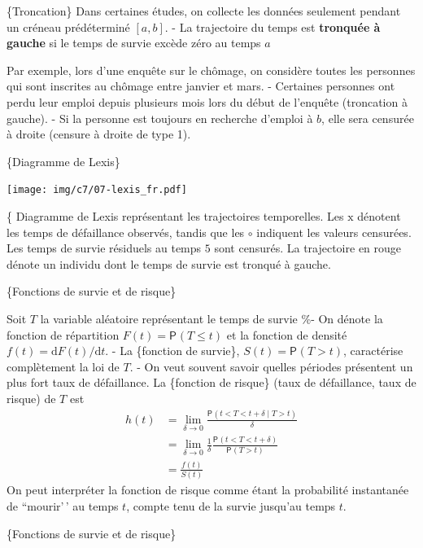 \documentclass[
  11pt,
  letterpaper,
]{article}
\theoremstyle{definition}
\theoremstyle{definition}
\theoremstyle{definition}
\theoremstyle{definition}
\theoremstyle{remark}
\begin{document}
\{Troncation\}
Dans certaines études, on collecte les données seulement pendant un créneau prédéterminé \([a, b]\).
- La trajectoire du temps est \textbf{tronquée à gauche} si le temps de survie excède zéro au temps \(a\)

Par exemple, lors d'une enquête sur le chômage, on considère toutes les personnes qui sont inscrites au chômage entre janvier et mars.
- Certaines personnes ont perdu leur emploi depuis plusieurs mois lors du début de l'enquête (troncation à gauche).
- Si la personne est toujours en recherche d'emploi à \(b\), elle sera censurée à droite (censure à droite de type 1).

\{Diagramme de Lexis\}

\begin{center}
  \texttt{[image: img/c7/07-lexis\_fr.pdf]}
 \end{center}

\{ \footnotesize Diagramme de Lexis représentant les trajectoires temporelles. Les \(\mathrm{x}\) dénotent les temps de défaillance observés, tandis que les \(\circ\) indiquent les valeurs censurées. Les temps de survie résiduels au temps \(5\) sont censurés. La trajectoire en rouge dénote un individu dont le temps de survie est tronqué à gauche.

\{Fonctions de survie et de risque\}

Soit \(T\) la variable aléatoire représentant le temps de survie
\%- On dénote la fonction de répartition \(F(t) = {\mathsf P}_{}\left(T \leq t\right)\) et la fonction de densité \(f(t) = \mathrm{d}F(t) / \mathrm{d}t\).
- La \{fonction de survie\}, \(S(t) = {\mathsf P}_{}\left(T>t\right)\), caractérise complètement la loi de \(T\).
- On veut souvent savoir quelles périodes présentent un plus fort taux de défaillance.
La \{fonction de risque\} (taux de défaillance, taux de risque) de \(T\) est
\begin{align*}
h(t) &= \lim_{\delta \to 0} \frac{{\mathsf P}_{}\left(t < T<t + \delta \mid T>t\right)}{\delta} 
\\&= \lim_{\delta \to 0} \frac{1}{\delta}\frac{{\mathsf P}_{}\left(t < T < t + \delta\right)}{{\mathsf P}_{}\left(T>t\right)} \\&= \frac{f(t)}{S(t)}
\end{align*}
On peut interpréter la fonction de risque comme étant la probabilité instantanée de ``mourir'\,' au temps \(t\), compte tenu de la survie jusqu'au temps \(t\).

\{Fonctions de survie et de risque\}
\end{document}
